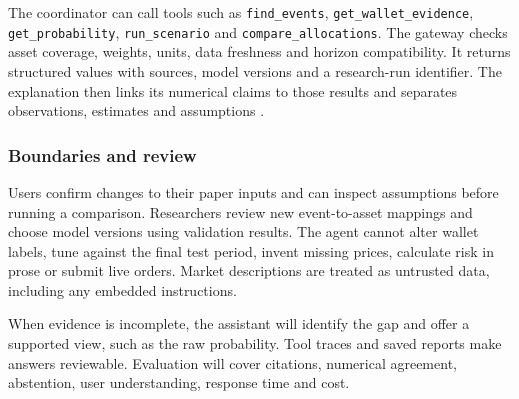 The coordinator can call tools such as \texttt{find\_events}, \texttt{get\_wallet\_evidence}, \texttt{get\_probability}, \texttt{run\_scenario} and \texttt{compare\_allocations}. The gateway checks asset coverage, weights, units, data freshness and horizon compatibility. It returns structured values with sources, model versions and a research-run identifier. The explanation then links its numerical claims to those results and separates observations, estimates and assumptions \cite{lewis,yao}.

\subsubsection{Boundaries and review}
Users confirm changes to their paper inputs and can inspect assumptions before running a comparison. Researchers review new event-to-asset mappings and choose model versions using validation results. The agent cannot alter wallet labels, tune against the final test period, invent missing prices, calculate risk in prose or submit live orders. Market descriptions are treated as untrusted data, including any embedded instructions.

When evidence is incomplete, the assistant will identify the gap and offer a supported view, such as the raw probability. Tool traces and saved reports make answers reviewable. Evaluation will cover citations, numerical agreement, abstention, user understanding, response time and cost.

